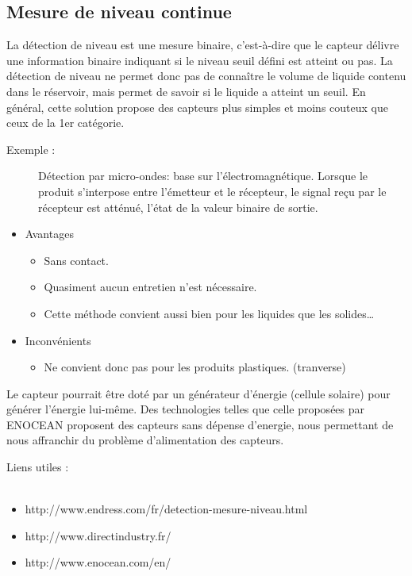 	\subsection {Mesure de niveau continue}
	La détection de niveau est une mesure binaire, c'est-à-dire que le capteur délivre une information binaire indiquant si le niveau seuil défini est atteint ou 		pas. La détection de niveau ne permet donc pas de connaître le volume de liquide contenu dans le réservoir, mais permet de savoir si le liquide a atteint un 		seuil. En général, cette solution propose des capteurs plus simples et moins couteux que ceux de la 1er catégorie.

	\begin {description}
		\item [Exemple :]
	Détection par micro-ondes: base sur l’électromagnétique. Lorsque le produit s'interpose entre l'émetteur et le récepteur, le signal reçu par le récepteur est atténué,  l'état de la valeur binaire de sortie.
	\end {description}
	\begin {itemize}
		\item Avantages 
		\begin {itemize}
			\item Sans contact. 
			\item Quasiment aucun entretien n'est nécessaire. 
			\item Cette méthode convient aussi bien pour les liquides que les solides…
		\end {itemize}
		\item Inconvénients
		\begin {itemize}
			\item Ne convient donc pas pour les produits plastiques. (tranverse)
		\end {itemize}
	\end {itemize}

Le capteur pourrait être doté par un générateur d'énergie (cellule solaire) pour générer l'énergie lui-même. Des technologies telles que celle proposées par ENOCEAN proposent des capteurs sans dépense d'energie, nous permettant de nous affranchir du problème d'alimentation des capteurs.

Liens utiles : \\~
\begin {itemize}
	\item http://www.endress.com/fr/detection-mesure-niveau.html
	\item http://www.directindustry.fr/
	\item http://www.enocean.com/en/
\end {itemize}
